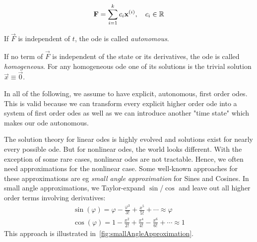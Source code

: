 		\begin{align*}
			\boldsymbol{\mathrm{F}} = \sum_{i = 1}^{k} c_i \boldsymbol{\mathrm{x}}^{(i)},\quad c_i \in \mathbb{R}
		\end{align*}
		\begin{description}[leftmargin = 3cm]
			\item[Autonomous] If \(\vec{F}\) is independent of \(t\), the \ac{ode} is called \emph{autonomous}.
			\item[Homogenity] If no term  of \(\vec{F}\) is independent of the state or its derivatives, the \ac{ode} is called \emph{homogeneous}. For any homogeneous \ac{ode} one of its solutions is the trivial solution \( \vec{x} \equiv \vec{0} \).
		\end{description}
		
		In all of the following, we assume to have explicit, autonomous, first order \acp{ode}. This is valid because we can transform every explicit higher order \ac{ode} into a system of first order \acp{ode} as well as we can introduce another "time state" which makes our \ac{ode} autonomous.
		
		The solution theory for linear \acp{ode} is highly evolved and solutions exist for nearly every possible \ac{ode}. But for nonlinear \acp{ode}, the world looks different. With the exception of some rare cases, nonlinear \acp{ode} are not tractable. Hence, we often need approximations for the nonlinear case. Some well-known approaches for these approximations are \ac{eg} \emph{small angle approximation} for Sines and Cosines. In small angle approximations, we Taylor-expand \( \sin \)/\( \cos \) and leave out all higher order terms involving derivatives:
		\begin{gather*}
			\sin(\varphi) = \varphi - \frac{\varphi^3}{3!} + \frac{x^5}{5!} + \cdots \approx \varphi \\
			\cos(\varphi) = 1 - \frac{x^2}{2!} + \frac{x^4}{4!} - \frac{x^6}{6!} + \cdots \approx 1
		\end{gather*}
		This approach is illustrated in~\autoref{fig:smallAngleApproximation}.
		
